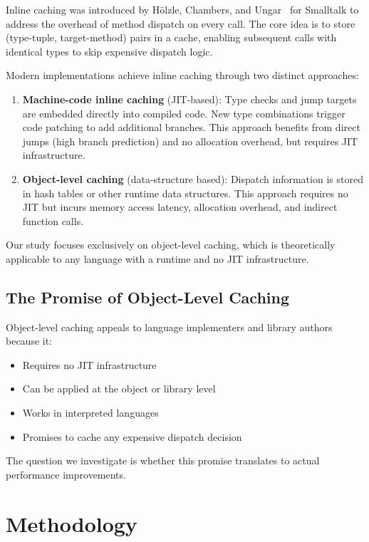 \documentclass[sigplan,final]{acmart}
\begin{document}
Inline caching was introduced by Hölzle, Chambers, and Ungar~\cite{hoelzle1991optimizing}
for Smalltalk to address the overhead of method dispatch on every call. The core idea is to
store (type-tuple, target-method) pairs in a cache, enabling subsequent calls with identical
types to skip expensive dispatch logic.

Modern implementations achieve inline caching through two distinct approaches:

\begin{enumerate}
  \item \textbf{Machine-code inline caching} (JIT-based): Type checks and jump targets are
    embedded directly into compiled code. New type combinations trigger code patching to add
    additional branches. This approach benefits from direct jumps (high branch prediction) and
    no allocation overhead, but requires JIT infrastructure.

  \item \textbf{Object-level caching} (data-structure based): Dispatch information is stored
    in hash tables or other runtime data structures. This approach requires no JIT but incurs
    memory access latency, allocation overhead, and indirect function calls.
\end{enumerate}

Our study focuses exclusively on object-level caching, which is theoretically applicable to any
language with a runtime and no JIT infrastructure.

\subsection{The Promise of Object-Level Caching}

Object-level caching appeals to language implementers and library authors because it:
\begin{itemize}
  \item Requires no JIT infrastructure
  \item Can be applied at the object or library level
  \item Works in interpreted languages
  \item Promises to cache any expensive dispatch decision
\end{itemize}

The question we investigate is whether this promise translates to actual performance improvements.

\section{Methodology}
\end{document}
